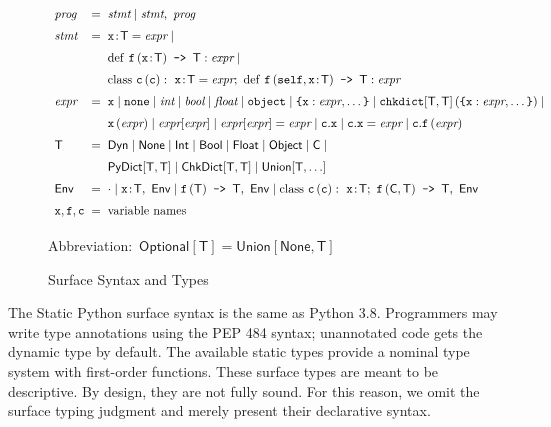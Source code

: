 \documentclass[english,cleveref,submission]{programming}
\makeatletter
\newcommand{\SP}{Static Python}
\newcommand{\code}[1]{\texttt{#1}}
\newcommand{\defeq}{=}
\newcommand{\langmid}{\mid} %
\newenvironment{langarray}{\(\def\arraystretch{1.5}\begin{array}{l@{\hspace{2mm}}c@{\hspace{2mm}}l}}{\end{array}\)}
\newcommand{\spapp}[2]{#1\,(#2)}
\newcommand{\spann}[2]{#1\!:\!#2}
\newcommand{\typefont}[1]{\mathsf{#1}}
\newcommand{\codefont}[1]{\emph{#1}}
\newcommand{\paramtype}[2]{#1[#2]}
\newcommand{\sptype}{\typefont{T}}
\newcommand{\sptclass}{\typefont{C}}
\newcommand{\sptint}{\typefont{Int}}
\newcommand{\sptbool}{\typefont{Bool}}
\newcommand{\sptfloat}{\typefont{Float}}
\newcommand{\sptdyn}{\typefont{Dyn}}
\newcommand{\sptobject}{\typefont{Object}}
\newcommand{\sptnone}{\typefont{None}}
\newcommand{\sptoptional}[1]{\paramtype{\typefont{Optional}}{#1}}
\newcommand{\sptunion}[1]{\paramtype{\typefont{Union}}{#1}}
\newcommand{\sptrawpydict}{\typefont{PyDict}}
\newcommand{\sptpydict}[2]{\paramtype{\sptrawpydict}{#1, #2}}
\newcommand{\sptchkdict}[2]{\paramtype{\typefont{ChkDict}}{#1, #2}}
\newcommand{\sptenv}{\typefont{Env}}
\newcommand{\sptenvnil}{\cdot}
\newcommand{\sptvardef}[2]{\spann{#1}{#2}}
\newcommand{\sptfundef}[3]{\spapp{#1}{#2}\code{ -> }#3}
\newcommand{\sptclassdef}[4]{\mathrm{class}~\spapp{#1}{#2}:~#3;~#4}
\newcommand{\spx}{\code{x}}
\newcommand{\spf}{\code{f}}
\newcommand{\spc}{\code{c}}
\newcommand{\spprog}{\codefont{prog}}
\newcommand{\spstmt}{\codefont{stmt}}
\newcommand{\spexpr}{\codefont{expr}}
\newcommand{\spvardef}[3]{\sptvardef{#1}{#2} = #3}
\newcommand{\spfundef}[4]{\mathrm{def}~\spapp{#1}{#2}\code{ -> }#3: #4}
\newcommand{\spclassdef}[4]{\mathrm{class}~\spapp{#1}{#2}:~#3;~#4}
\newcommand{\spself}{\code{self}}
\newcommand{\spobject}{\code{object}}
\newcommand{\spnone}{\code{none}}
\newcommand{\spint}{\codefont{int}}
\newcommand{\spbool}{\codefont{bool}}
\newcommand{\spfloat}{\codefont{float}}
\newcommand{\sppydict}[1]{\code{\{}#1\code{\}}}
\newcommand{\spchkdict}[3]{\spapp{\paramtype{\code{chkdict}}{#1, #2}}{#3}}
\newcommand{\spdictref}[2]{#1[#2]}
\newcommand{\spdictset}[3]{\spdictref{#1}{#2} = #3}
\newcommand{\spobjref}[2]{#1.#2}
\newcommand{\spobjset}[3]{\spobjref{#1}{#2} = #3}
\newcommand{\spobjapp}[3]{\spobjref{#1}{\spapp{#2}{#3}}}
\makeatother
\begin{document}
\begin{figure}[t]
  \begin{langarray}
    \spprog & \defeq &
      \spstmt \langmid \spstmt,~\spprog
  \\
    \spstmt & \defeq &
      \spvardef{\spx}{\sptype}{\spexpr} \langmid
  \\ & &
      \spfundef{\spf}{\spann{\spx}{\sptype}}{\sptype}{\spexpr} \langmid
  \\ & &
      \spclassdef{\spc}{\spc}{\spvardef{\spx}{\sptype}{\spexpr}}{\spfundef{\spf}{\spself, \spann{\spx}{\sptype}}{\sptype}{\spexpr}}
  \\
    \spexpr & \defeq &
      \spx \langmid \spnone \langmid \spint \langmid \spbool \langmid \spfloat \langmid \spobject \langmid
      \sppydict{\spx: \spexpr, \ldots} \langmid
      \spchkdict{\sptype}{\sptype}{\sppydict{\spx: \spexpr, \ldots}} \langmid
  \\ & &
      \spapp{\spx}{\spexpr} \langmid
      \spdictref{\spexpr}{\spexpr} \langmid
      \spdictset{\spexpr}{\spexpr}{\spexpr} \langmid
      \spobjref{\spc}{\spx} \langmid
      \spobjset{\spc}{\spx}{\spexpr} \langmid
      \spobjapp{\spc}{\spf}{\spexpr}
  \\
    \sptype & \defeq &
      \sptdyn \langmid
      \sptnone \langmid
      \sptint \langmid
      \sptbool \langmid
      \sptfloat \langmid
      \sptobject \langmid
      \sptclass \langmid
  \\ & &
      \sptpydict{\sptype}{\sptype} \langmid
      \sptchkdict{\sptype}{\sptype} \langmid
      \sptunion{\sptype, \ldots}
  \\
    \sptenv & \defeq &
      \sptenvnil \langmid
      \sptvardef{\spx}{\sptype},~\sptenv \langmid
      \sptfundef{\spf}{\sptype}{\sptype},~\sptenv \langmid
      \sptclassdef{\spc}{\spc}{\sptvardef{\spx}{\sptype}}{\sptfundef{\spf}{\sptclass, \sptype}{\sptype}},~\sptenv
  \\
    \spx, \spf, \spc & \defeq & \mbox{variable names}
  \end{langarray}

  \bigskip
  \mbox{Abbreviation: $\sptoptional{\sptype} \defeq \sptunion{\sptnone, \sptype}$}

  \caption{Surface Syntax and Types}
  \label{f:surface-types}
\end{figure}

The \SP{} surface syntax is the same as Python 3.8.
Programmers may write type annotations using the PEP 484 syntax;
unannotated code gets the dynamic type by default.
The available static types provide a nominal type system with first-order functions.
These surface types are meant to be descriptive.
By design, they are not fully sound.
For this reason, we omit the surface typing judgment and merely present their
declarative syntax.
\end{document}
